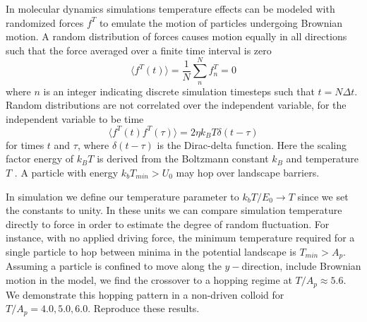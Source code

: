 \documentclass[twocolumn,preprintnumbers,amsmath,amssymb,aps,prx]{revtex4}
\begin{document}
  In molecular dynamics simulations temperature effects
  can be modeled with randomized forces $f^T$
  to emulate the motion of particles undergoing Brownian motion.
  A random distribution of forces
  causes motion
  equally in all
  directions such that the force averaged over a finite time interval
  is zero
  \begin{equation}
    \langle f^T(t) \rangle = \frac{1}{N} \sum_n^N f^T_n = 0
  \end{equation}
  where $n$ is an integer indicating
  discrete simulation timesteps
  such that $t = N \Delta t$.
  Random distributions are not correlated 
  over the independent variable,
  for the independent variable to be time
  \begin{equation}
  \langle f^T(t) f^T(\tau)\rangle = 2 \eta k_B T \delta(t-\tau)
  \end{equation}
  for times $t$ and $\tau$,
  where $\delta(t-\tau)$ is the Dirac-delta function.
  Here the scaling factor energy of 
  $k_B T$ is
  derived from the Boltzmann constant $k_B$
  and temperature $T$ \cite{Allen2017}.
  A particle
  with energy $k_b T_{min} > U_0$ may 
  hop over landscape
  barriers.

  In simulation we define our temperature parameter to
  $k_b T/E_0 \rightarrow T$
  since we set the constants to unity.
  In these units we can compare 
  simulation temperature directly
  to force 
  in order to estimate the degree of random fluctuation.
  For instance, 
  with
  no applied driving force,
  the minimum temperature required for a single particle
  to hop between minima in the potential landscape is
  $T_{min} > A_p$.
  Assuming a particle is confined to
  move along the $y-$direction,
  include Brownian motion 
  in the model,
  we find the crossover
  to a hopping regime at $T/A_p \approx 5.6$.
  We demonstrate this hopping
  pattern in 
  a non-driven colloid for $T/A_p = 4.0, 5.0, 6.0$.
  Reproduce these results.
  
\end{document}
